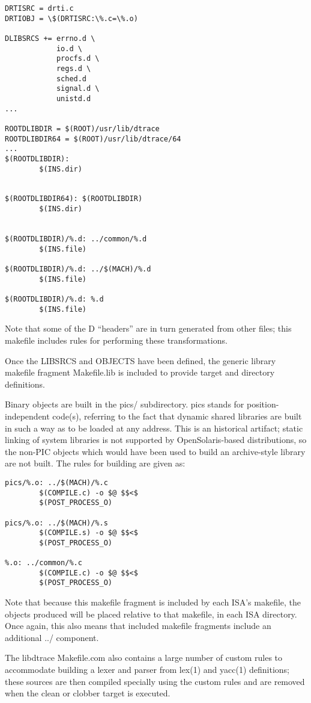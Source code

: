 \documentclass{article}
\begin{document}
\begin{verbatim}
DRTISRC = drti.c
DRTIOBJ = \$(DRTISRC:\%.c=\%.o)

DLIBSRCS += errno.d \
            io.d \
            procfs.d \
            regs.d \
            sched.d
            signal.d \
            unistd.d
...

ROOTDLIBDIR = $(ROOT)/usr/lib/dtrace
ROOTDLIBDIR64 = $(ROOT)/usr/lib/dtrace/64
...
$(ROOTDLIBDIR):
        $(INS.dir)


$(ROOTDLIBDIR64): $(ROOTDLIBDIR)
        $(INS.dir)


$(ROOTDLIBDIR)/%.d: ../common/%.d
        $(INS.file)

$(ROOTDLIBDIR)/%.d: ../$(MACH)/%.d
        $(INS.file)

$(ROOTDLIBDIR)/%.d: %.d
        $(INS.file)
\end{verbatim}

Note that some of the D ``headers'' are in turn generated from other files;
this makefile includes rules for performing these transformations.

Once the LIBSRCS and OBJECTS have been defined, the generic library makefile
fragment Makefile.lib is included to provide target and directory definitions.

Binary objects are built in the pics/ subdirectory. pics stands for position-
independent code(s), referring to the fact that dynamic shared libraries are
built in such a way as to be loaded at any address. This is an historical
artifact; static linking of system libraries is not supported by
OpenSolaris-based distributions, so the non-PIC objects which would have been
used to build an archive-style library are not built. The rules for building
are given as:

\begin{verbatim}
pics/%.o: ../$(MACH)/%.c
        $(COMPILE.c) -o $@ $$<$
        $(POST_PROCESS_O)

pics/%.o: ../$(MACH)/%.s
        $(COMPILE.s) -o $@ $$<$
        $(POST_PROCESS_O)

%.o: ../common/%.c
        $(COMPILE.c) -o $@ $$<$
        $(POST_PROCESS_O)
\end{verbatim}

Note that because this makefile fragment is included by each ISA's makefile,
the objects produced will be placed relative to that makefile, in each ISA
directory. Once again, this also means that included makefile fragments include
an additional ../ component.

The libdtrace Makefile.com also contains a large number of custom rules to
accommodate building a lexer and parser from lex(1) and yacc(1) definitions;
these sources are then compiled specially using the custom rules and are
removed when the clean or clobber target is executed.
\end{document}
